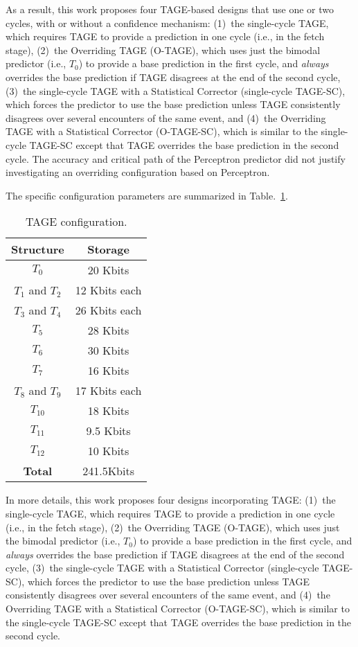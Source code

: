 As a result, this work proposes four TAGE-based designs that use one or two cycles, with or without a confidence mechanism:  (1)~the single-cycle TAGE, which requires TAGE to provide a prediction in one cycle (i.e., in the fetch stage), (2)~the Overriding TAGE (\mbox{O-TAGE}), which uses just the bimodal predictor (i.e., $T_0$) to provide a base prediction in the first cycle, and \textit{always} overrides the base prediction if TAGE disagrees at the end of the second cycle, (3)~the single-cycle TAGE with a Statistical Corrector (single-cycle \mbox{TAGE-SC}), which forces the predictor to use the base prediction unless TAGE consistently disagrees over several encounters of the same event, and (4)~the Overriding TAGE with a Statistical Corrector (\mbox{O-TAGE-SC}), which is similar to the single-cycle \mbox{TAGE-SC} except that TAGE overrides the base prediction in the second cycle. The accuracy and critical path of the Perceptron predictor did not justify investigating an overriding configuration based on Perceptron.

The specific configuration parameters are summarized in Table.~\ref{tab:tageconfig}. 

\begin{table}[h]
\begin{center}
\begin{tabular} {|c|c|}
\hline
\textbf{Structure} & \textbf{Storage} \\ \hline
$T_0$ & 20 Kbits\\
$T_1$ and $T_2$ & 12 Kbits each\\
$T_3$ and $T_4$ & 26 Kbits each\\
$T_5$ & 28 Kbits\\
$T_6$ & 30 Kbits\\
$T_7$ & 16 Kbits\\
$T_8$ and $T_9$ & 17 Kbits each\\
$T_10$ & 18 Kbits\\
$T_11$ & 9.5 Kbits\\
$T_12$ & 10 Kbits\\ \hline
\textbf{Total} & 241.5Kbits \\ \hline
\end{tabular}
\caption{TAGE configuration.\label{tab:tageconfig}}
\end{center}
\end{table}



In more details, this work proposes four designs incorporating TAGE:  (1)~the single-cycle TAGE, which requires TAGE to provide a prediction in one cycle (i.e., in the fetch stage), (2)~the Overriding TAGE (\mbox{O-TAGE}), which uses just the bimodal predictor (i.e., $T_0$) to provide a base prediction in the first cycle, and \textit{always} overrides the base prediction if TAGE disagrees at the end of the second cycle, (3)~the single-cycle TAGE with a Statistical Corrector (single-cycle \mbox{TAGE-SC}), which forces the predictor to use the base prediction unless TAGE consistently disagrees over several encounters of the same event, and (4)~the Overriding TAGE with a Statistical Corrector (\mbox{O-TAGE-SC}), which is similar to the single-cycle \mbox{TAGE-SC} except that TAGE overrides the base prediction in the second cycle.

